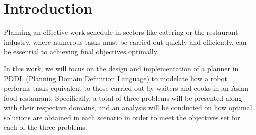 \section{Introduction}

Planning an effective work schedule in sectors like catering or the restaurant industry, where numerous tasks must be carried out quickly and efficiently, can be essential to achieving final objectives optimally.

In this work, we will focus on the design and implementation of a planner in PDDL (Planning Domain Definition Language) to modelate how a robot performs tasks equivalent to those carried out by waiters and cooks in an Asian food restaurant. Specifically, a total of three problems will be presented along with their respective domains, and an analysis will be conducted on how optimal solutions are obtained in each scenario in order to meet the objectives set for each of the three problems.